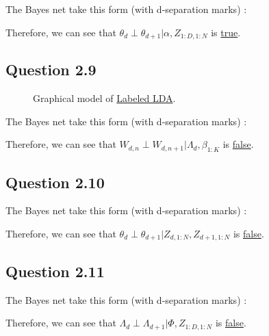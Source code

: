 \documentclass{article}
\begin{document}
The Bayes net take this form (with d-separation marks) :
\begin{figure}[H]
    \centering
    
    \label{fig:fig1.2.8}
\end{figure}

Therefore, we can see that $\theta_{d} \perp \theta_{d+1} | \alpha, Z_{1:D,1:N}$ is \underline{true}.

\subsection{Question 2.9}

\begin{figure}[H]
    \centering
    
    \caption{Graphical model of \href{https://aclanthology.org/D09-1026.pdf}{Labeled LDA}.}
    \label{fig:fig2}
\end{figure}

The Bayes net take this form (with d-separation marks) :
\begin{figure}[H]
    \centering
    
    \label{fig:fig1.2.9}
\end{figure}

Therefore, we can see that $W_{d,n} \perp W_{d,n+1} | \Lambda_d, \beta_{1:K}$ is \underline{false}.

\subsection{Question 2.10}

The Bayes net take this form (with d-separation marks) :
\begin{figure}[H]
    \centering
    
    \label{fig:fig1.2.10}
\end{figure}

Therefore, we can see that $\theta_{d} \perp \theta_{d+1} | Z_{d,1:N}, Z_{d+1,1:N}$ is \underline{false}.

\subsection{Question 2.11}

The Bayes net take this form (with d-separation marks) :
\begin{figure}[H]
    \centering
    
    \label{fig:fig1.2.11}
\end{figure}

Therefore, we can see that $\Lambda_{d} \perp \Lambda_{d+1} | \Phi, Z_{1:D,1:N}$ is \underline{false}.
\end{document}
